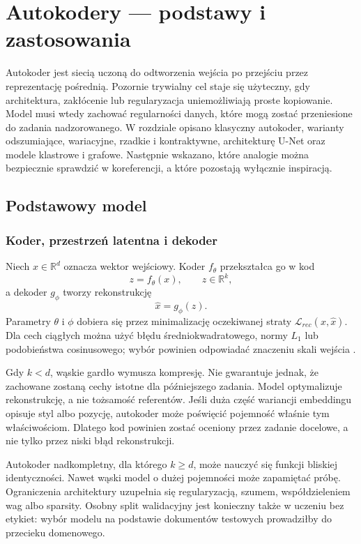 \chapter{Autokodery --- podstawy i zastosowania}
\label{chap:autokodery}

Autokoder jest siecią uczoną do odtworzenia wejścia po przejściu przez reprezentację pośrednią. Pozornie trywialny cel staje się użyteczny, gdy architektura, zakłócenie lub regularyzacja uniemożliwiają proste kopiowanie. Model musi wtedy zachować regularności danych, które mogą zostać przeniesione do zadania nadzorowanego. W rozdziale opisano klasyczny autokoder, warianty odszumiające, wariacyjne, rzadkie i kontraktywne, architekturę U-Net oraz modele klastrowe i grafowe. Następnie wskazano, które analogie można bezpiecznie sprawdzić w koreferencji, a które pozostają wyłącznie inspiracją.

\section{Podstawowy model}
\label{sec:ae-podstawy}

\subsection{Koder, przestrzeń latentna i dekoder}

Niech $x\in\mathbb{R}^{d}$ oznacza wektor wejściowy. Koder $f_\theta$ przekształca go w kod
\[
z=f_\theta(x), \qquad z\in\mathbb{R}^{k},
\]
a dekoder $g_\phi$ tworzy rekonstrukcję
\[
\hat{x}=g_\phi(z).
\]
Parametry $\theta$ i $\phi$ dobiera się przez minimalizację oczekiwanej straty $\mathcal{L}_{rec}(x,\hat{x})$. Dla cech ciągłych można użyć błędu średniokwadratowego, normy $L_1$ lub podobieństwa cosinusowego; wybór powinien odpowiadać znaczeniu skali wejścia \cite{goodfellow_2016_deep}.

Gdy $k<d$, wąskie gardło wymusza kompresję. Nie gwarantuje jednak, że zachowane zostaną cechy istotne dla późniejszego zadania. Model optymalizuje rekonstrukcję, a nie tożsamość referentów. Jeśli duża część wariancji embeddingu opisuje styl albo pozycję, autokoder może poświęcić pojemność właśnie tym właściwościom. Dlatego kod powinien zostać oceniony przez zadanie docelowe, a nie tylko przez niski błąd rekonstrukcji.

Autokoder nadkompletny, dla którego $k\geq d$, może nauczyć się funkcji bliskiej identyczności. Nawet wąski model o dużej pojemności może zapamiętać próbę. Ograniczenia architektury uzupełnia się regularyzacją, szumem, współdzieleniem wag albo sparsity. Osobny split walidacyjny jest konieczny także w uczeniu bez etykiet: wybór modelu na podstawie dokumentów testowych prowadziłby do przecieku domenowego.

